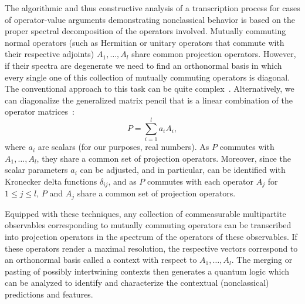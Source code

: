 \documentclass[
  twocolumn,
 showpacs,
 showkeys,
 preprintnumbers,
 amsmath,amssymb,
 aps,
 pra,
  longbibliography,
 floatfix,
 ]{revtex4-2}
\begin{document}
The  algorithmic  and thus constructive
analysis of a transcription process for cases of operator-value arguments demonstrating nonclassical behavior is based on the proper spectral decomposition of the operators involved.
Mutually commuting normal operators (such as Hermitian or unitary operators that commute with their respective adjoints)
 $A_1, \ldots, A_l$ share common projection operators.
However, if their spectra are degenerate we need to find an orthonormal basis in which every single one of this collection of mutually commuting operators is diagonal.
The conventional approach to this task can be quite complex~\cite{Nordgren2020Jun}.
Alternatively, we can diagonalize the generalized matrix pencil that is a linear combination of the
operator matrices~\cite[Chapter~12]{Gantmacher2}:
\begin{equation}
P = \sum_{i=1}^{l} a_i A_i,
\label{2024-convert-matrixpencil}
\end{equation}
where $a_i$ are scalars (for our purposes, real numbers).
As $P$ commutes with $A_1, \ldots, A_l$, they share a common set of projection operators.
Moreover, since the scalar parameters $a_i$ can be adjusted, and in particular, can be identified with Kronecker delta functions $\delta_{ij}$,
and as $P$ commutes with each operator $A_j$ for $1 \le j \le l$, $P$ and $A_j$ share a common set of projection operators.

Equipped with these techniques, any collection of commeasurable multipartite observables corresponding
to mutually commuting operators can be transcribed into
projection operators
in the spectrum of the operators of these observables.
If these operators render a maximal resolution, the respective vectors correspond to an orthonormal basis called a context with respect to $A_1, \ldots, A_l$.
The merging or pasting of possibly intertwining contexts then generates a quantum logic which can be
analyzed to identify and characterize the contextual (nonclassical) predictions and features.

\end{document}
